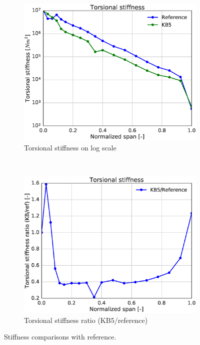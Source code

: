 \begin{figure}[tph]
\begin{subfigure}{0.50\textwidth}
\includegraphics[width=\linewidth]{figures/KB6_final/KB5_torsStiff_log.eps}
\caption{Torsional stiffness on log scale}
\label{subfig:KB5_torsstiff_log}
\end{subfigure}
 ~
\begin{subfigure}{0.50\textwidth}
\includegraphics[width=\linewidth]{figures/KB6_final/KB5_torsStiff_ratio.eps}
\caption{Torsional stiffness ratio (KB5/reference)}
\label{subfig:KB5_torsstiff_ratio}
\end{subfigure}

\caption{ Stiffness comparisons with reference.}
\label{fig:KB5_stiffness}
\end{figure}

